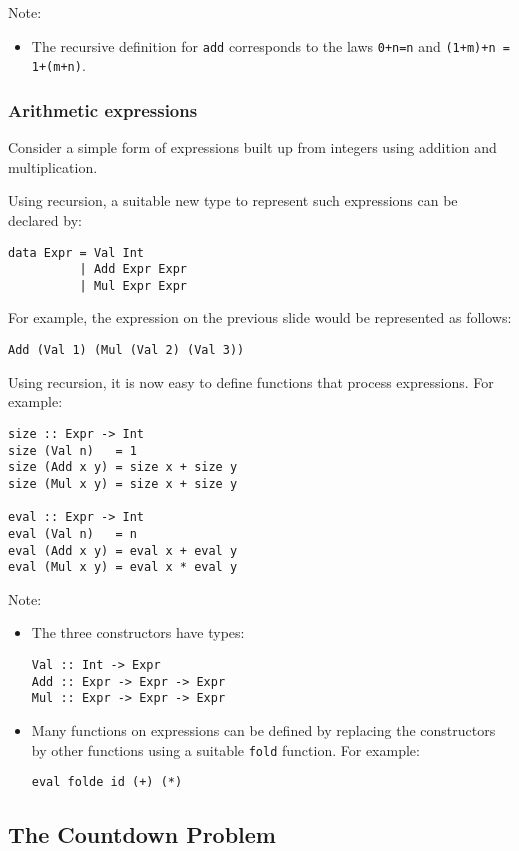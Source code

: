 \begin{multicols}{2}
Note:
\begin{itemize}
  \item The recursive definition for \lstinline{add} corresponds to the laws \lstinline{0+n=n} and \lstinline{(1+m)+n = 1+(m+n)}.
\end{itemize}

\subsubsection{Arithmetic expressions}
Consider a simple form of expressions built up from integers using addition and multiplication.

Using recursion, a suitable new type to represent such expressions can be declared by:
\begin{lstlisting}
data Expr = Val Int
          | Add Expr Expr
          | Mul Expr Expr
\end{lstlisting}

For example, the expression on the previous slide would be represented as follows:
\begin{lstlisting}
Add (Val 1) (Mul (Val 2) (Val 3))
\end{lstlisting}

Using recursion, it is now easy to define functions that process expressions.
For example:
\begin{lstlisting}
size :: Expr -> Int
size (Val n)   = 1
size (Add x y) = size x + size y
size (Mul x y) = size x + size y

eval :: Expr -> Int
eval (Val n)   = n
eval (Add x y) = eval x + eval y
eval (Mul x y) = eval x * eval y
\end{lstlisting}

Note:
\begin{itemize}
  \item The three constructors have types:
\begin{lstlisting}
Val :: Int -> Expr
Add :: Expr -> Expr -> Expr
Mul :: Expr -> Expr -> Expr
\end{lstlisting}
  \item Many functions on expressions can be defined by replacing the constructors by other functions using a suitable \lstinline{fold} function. For example:
\begin{lstlisting}
eval folde id (+) (*)
\end{lstlisting}
\end{itemize}


\subsection{The Countdown Problem}

\end{multicols}
